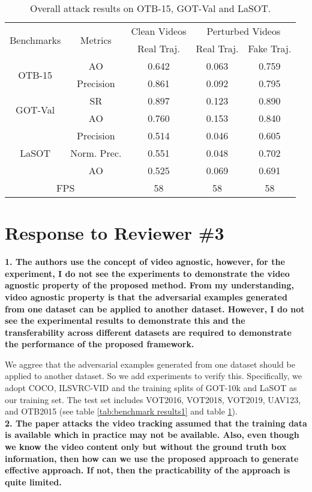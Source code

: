 \documentclass{article}
\begin{document}
\begin{table}[h]
    \centering
    \caption{Overall attack results on OTB-15, GOT-Val and LaSOT.}
    \begin{tabular}{c c | c | c | c}
    \toprule
    \multirow{2}{*}[-2pt]{Benchmarks} & \multirow{2}{*}[-2pt]{Metrics} & Clean Videos    & \multicolumn{2}{c}{Perturbed Videos}  \\
    \cmidrule{3-5}
                              &                         & Real Traj. & Real Traj. & Fake Traj.     \\ 
    \midrule
    \multirow{2}{*}{OTB-15} 
    & AO   & 0.642 & 0.063 & 0.759\\
    & Precision & 0.861 & 0.092 & 0.795\\
    \midrule
    \multirow{2}{*}{GOT-Val} 
    & SR & 0.897 & 0.123 & 0.890\\
    & AO & 0.760 & 0.153 & 0.840 \\
    \midrule
    \multirow{3}{*}{LaSOT} 
    & Precision  & 0.514 & 0.046 & 0.605\\
    & Norm. Prec.& 0.551 & 0.048 & 0.702\\
    & AO         & 0.525 & 0.069 & 0.691\\
    \midrule
    \multicolumn{2}{c|}{FPS} & 58 & 58 & 58\\
    \bottomrule
    \end{tabular}
    \label{tab:benchmark results}
  \end{table}

\section*{Response to Reviewer \#3}

\textbf{1. The authors use the concept of video agnostic, however, for the experiment, I do not see the experiments to demonstrate the video agnostic property of the proposed method. From my understanding, video agnostic property is that the adversarial examples generated from one dataset can be applied to another dataset. However, I do not see the experimental results to demonstrate this and the transferability across different datasets are required to demonstrate the performance of the proposed framework.}

We aggree that the adversarial examples generated from one dataset should be applied to another dataset. So we add experiments to verify this. Specifically, we adopt COCO, ILSVRC-VID and the training splits of GOT-10k and LaSOT as our training set. The test set includes VOT2016, VOT2018, VOT2019, UAV123, and OTB2015 (see table \ref{tab:benchmark results1} and table \ref{tab:benchmark results}).
\\[6pt]
\noindent \textbf{2. The paper attacks the video tracking assumed that the training data is available which in practice may not be available. Also, even though we know the video content only but without the ground truth box information, then how can we use the proposed approach to generate effective approach. If not, then the practicability of the approach is quite limited.}
\end{document}
